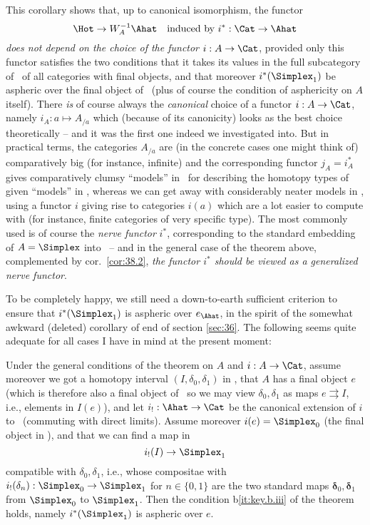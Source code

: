 This corollary shows that, up to canonical isomorphism, the functor
\[\Hot\to W_A^{-1}\Ahat\quad\text{induced by $i^*:\Cat\to\Ahat$}\]
\emph{does not depend on the choice of the functor} $i:A\to\Cat$,
provided only this functor satisfies the two conditions that it takes
its values in the full subcategory of \Cat\ of all categories with
final objects, and that moreover $i^*(\Simplex_1)$ be aspheric over the
final object of \Ahat\ (plus of course the condition of asphericity on
$A$ itself). There \emph{is} of course always the \emph{canonical}
choice of a functor $i:A\to\Cat$, namely $i_A: a\mapsto A_{/a}$ which
(because of its canonicity) looks as the best choice theoretically --
and it was the first one indeed we investigated into. But in practical
terms, the categories $A_{/a}$ are (in the concrete cases one might
think of) comparatively big (for instance, infinite) and the
corresponding functor $j_A=i_A^*$ gives comparatively clumsy
``models'' in \Ahat\ for describing the homotopy types of given
``models'' in \Cat, whereas we can get away with considerably neater
models in \Ahat, using a functor $i$ giving rise to categories $i(a)$
which are a lot easier to compute with (for instance, finite
categories of very specific type). The most commonly used is of course
the \emph{nerve functor} $i^*$, corresponding to the standard
embedding of $A=\Simplex$ into \Cat\ -- and in the general case of the
theorem above, complemented by cor.\ \ref{cor:38.2},
\emph{the functor $i^*$ should be viewed as a generalized nerve
  functor}.

To be completely happy, we still need a down-to-earth sufficient
criterion to ensure that $i^*(\Simplex_1)$ is aspheric over $e_\Ahat$,
in the spirit of the somewhat awkward (deleted) corollary of end of section \ref{sec:36}. The following seems quite adequate for all
cases I have in mind at the present moment:

\begin{corollarynum}\label{cor:38.3}
  Under the general conditions of the theorem on $A$ and $i:A\to\Cat$,
  assume moreover we got a homotopy interval $(I,\delta_0,\delta_1)$
  in \Ahat, that $A$ has a final object $e$ \textup(which is therefore
  also a final object of \Ahat\ so we may view $\delta_0,\delta_1$ as
  maps $e\rightrightarrows I$, i.e., elements in $I(e)$\textup), and
  let $i_!:\Ahat\to\Cat$ be the canonical extension of $i$ to \Ahat\
  \textup(commuting with direct limits\textup). Assume moreover
  $i(e)=\Simplex_0$ \textup(the final object in \Cat\textup), and that
  we can find a map in \Cat
  \[i_!(I) \to \Simplex_1\]
  compatible with $\delta_0,\delta_1$, i.e., whose compositae with
  $i_!(\delta_n) : \Simplex_0\to\Simplex_1$ for $n\in\{0,1\}$ are the
  two standard maps $\boldsymbol\delta_0,\boldsymbol\delta_1$ from
  $\Simplex_0$ to $\Simplex_1$. Then the condition
  \textup{b\ref{it:key.b.iii}} of the theorem holds, namely
  $i^*(\Simplex_1)$ is aspheric over $e$.
\end{corollarynum}

